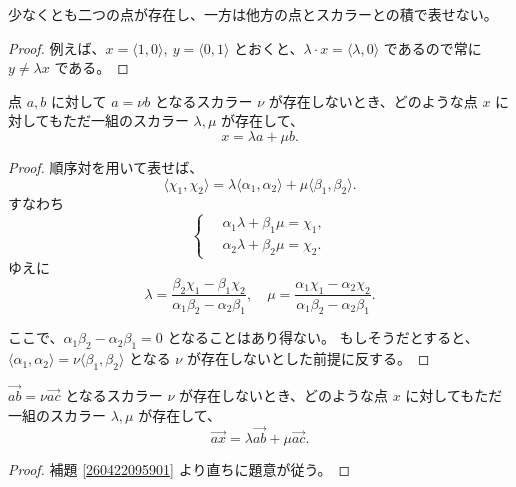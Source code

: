 
\begin{thm}
  少なくとも二つの点が存在し、一方は他方の点とスカラーとの積で表せない。
\end{thm}

\begin{proof}
  例えば、\(x=\langle1,0\rangle,\ y=\langle0,1\rangle\) とおくと、\(\lambda\cdot x=\langle\lambda,0\rangle\) であるので常に \(y\neq\lambda x\) である。
\end{proof}


\begin{lmm}\label{260422095901}
  点 \(a,b\) に対して \(a=\nu b\) となるスカラー \(\nu\) が存在しないとき、どのような点 \(x\) に対してもただ一組のスカラー \(\lambda,\mu\) が存在して、
  \[x=\lambda a+\mu b.\]
\end{lmm}

\begin{proof}
  順序対を用いて表せば、
  \[\langle\chi_1,\chi_2\rangle=\lambda\langle\alpha_1,\alpha_2\rangle+\mu\langle\beta_1,\beta_2\rangle.\]
  すなわち
  \[
    \left\{\,
      \begin{aligned}
        & \alpha_1\lambda+\beta_1\mu=\chi_1, \\
        & \alpha_2\lambda+\beta_2\mu=\chi_2.
      \end{aligned}
    \right.
  \]
  ゆえに
  \[
    \lambda=\frac{\beta_2\chi_1-\beta_1\chi_2}{\alpha_1\beta_2-\alpha_2\beta_1},\quad
    \mu=\frac{\alpha_1\chi_1-\alpha_2\chi_2}{\alpha_1\beta_2-\alpha_2\beta_1}.
  \]

  ここで、\(\alpha_1\beta_2-\alpha_2\beta_1=0\) となることはあり得ない。
  もしそうだとすると、\(\langle\alpha_1,\alpha_2\rangle=\nu\langle\beta_1,\beta_2\rangle\) となる \(\nu\) が存在しないとした前提に反する。
\end{proof}


\begin{thm}\label{260424194701}
  \(\overrightarrow{ab}=\nu\overrightarrow{ac}\) となるスカラー \(\nu\) が存在しないとき、どのような点 \(x\) に対してもただ一組のスカラー \(\lambda,\mu\) が存在して、
  \[\overrightarrow{ax}=\lambda\overrightarrow{ab}+\mu\overrightarrow{ac}.\]
\end{thm}

\begin{proof}
  補題 \ref{260422095901} より直ちに題意が従う。
\end{proof}


